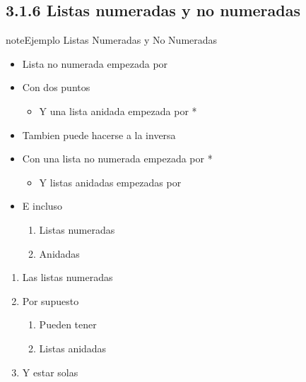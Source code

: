 \documentclass[a4paper,10pt,spanish]{sphinxmanual}
\begin{document}
\subsection{3.1.6 Listas numeradas y no numeradas}
\label{\detokenize{3_guia_myst/tipografia:listas-numeradas-y-no-numeradas}}
\begin{sphinxadmonition}{note}{Ejemplo Listas Numeradas y No Numeradas}
\begin{itemize}
\item {} 
\sphinxAtStartPar
Lista no numerada empezada por \sphinxhyphen{}

\item {} 
\sphinxAtStartPar
Con dos puntos
\begin{itemize}
\item {} 
\sphinxAtStartPar
Y una lista anidada empezada por *

\end{itemize}

\end{itemize}
\begin{itemize}
\item {} 
\sphinxAtStartPar
Tambien puede hacerse a la inversa

\item {} 
\sphinxAtStartPar
Con una lista no numerada empezada por *
\begin{itemize}
\item {} 
\sphinxAtStartPar
Y listas anidadas empezadas por \sphinxhyphen{}

\end{itemize}

\item {} 
\sphinxAtStartPar
E incluso
\begin{enumerate}
%
\item {} 
\sphinxAtStartPar
Listas numeradas

\item {} 
\sphinxAtStartPar
Anidadas

\end{enumerate}

\end{itemize}
\begin{enumerate}
%
\item {} 
\sphinxAtStartPar
Las listas numeradas

\item {} 
\sphinxAtStartPar
Por supuesto
\begin{enumerate}
%
\item {} 
\sphinxAtStartPar
Pueden tener

\item {} 
\sphinxAtStartPar
Listas anidadas

\end{enumerate}

\item {} 
\sphinxAtStartPar
Y estar solas

\end{enumerate}
\end{sphinxadmonition}
\end{document}
